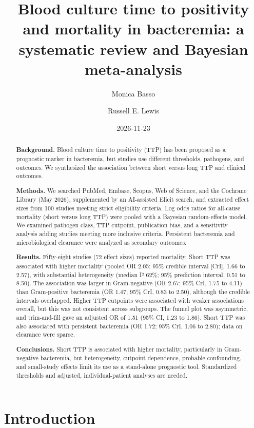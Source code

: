 \documentclass[
  11pt,
]{article}
\title{Blood culture time to positivity and mortality in bacteremia: a
systematic review and Bayesian meta-analysis}
\author{Monica Basso \and Russell E. Lewis}
\date{2026-11-23}
\begin{document}
\maketitle
\begin{abstract}
\textbf{Background.} Blood culture time to positivity (TTP) has been
proposed as a prognostic marker in bacteremia, but studies use different
thresholds, pathogens, and outcomes. We synthesized the association
between short versus long TTP and clinical outcomes.

\textbf{Methods.} We searched PubMed, Embase, Scopus, Web of Science,
and the Cochrane Library (May 2026), supplemented by an AI-assisted
Elicit search, and extracted effect sizes from 100 studies meeting
strict eligibility criteria. Log odds ratios for all-cause mortality
(short versus long TTP) were pooled with a Bayesian random-effects
model. We examined pathogen class, TTP cutpoint, publication bias, and a
sensitivity analysis adding studies meeting more inclusive criteria.
Persistent bacteremia and microbiological clearance were analyzed as
secondary outcomes.

\textbf{Results.} Fifty-eight studies (72 effect sizes) reported
mortality. Short TTP was associated with higher mortality (pooled OR
2.05; 95\% credible interval {[}CrI{]}, 1.66 to 2.57), with substantial
heterogeneity (median I² 62\%; 95\% prediction interval, 0.51 to 8.50).
The association was larger in Gram-negative (OR 2.67; 95\% CrI, 1.75 to
4.11) than Gram-positive bacteremia (OR 1.47; 95\% CrI, 0.83 to 2.50),
although the credible intervals overlapped. Higher TTP cutpoints were
associated with weaker associations overall, but this was not consistent
across subgroups. The funnel plot was asymmetric, and trim-and-fill gave
an adjusted OR of 1.51 (95\% CI, 1.23 to 1.86). Short TTP was also
associated with persistent bacteremia (OR 1.72; 95\% CrI, 1.06 to 2.80);
data on clearance were sparse.

\textbf{Conclusions.} Short TTP is associated with higher mortality,
particularly in Gram-negative bacteremia, but heterogeneity, cutpoint
dependence, probable confounding, and small-study effects limit its use
as a stand-alone prognostic tool. Standardized thresholds and adjusted,
individual-patient analyses are needed.
\end{abstract}


\section{Introduction}\label{introduction}
\end{document}
